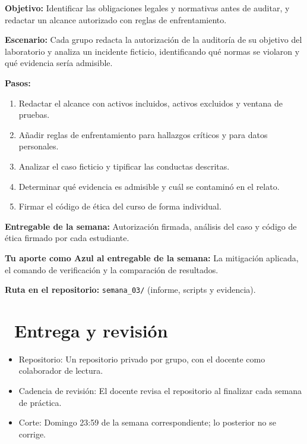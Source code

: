 \documentclass[11pt,a4paper]{article}
\newcommand{\iconotexto}[2]{\textcolor{cyanNeon}{\faIcon{#1}}~#2}
\begin{document}
\begin{tcolorbox}[cajaContenido,title={Semana 3 --- Carta de autorización y análisis de caso}]
\textbf{Objetivo:} Identificar las obligaciones legales y normativas antes de auditar, y redactar un alcance autorizado con reglas de enfrentamiento.

\textbf{Escenario:} Cada grupo redacta la autorización de la auditoría de su objetivo del laboratorio y analiza un incidente ficticio, identificando qué normas se violaron y qué evidencia sería admisible.


\textbf{Pasos:}
\begin{enumerate}[leftmargin=1.4em,itemsep=2pt,topsep=3pt]
  \item Redactar el alcance con activos incluidos, activos excluidos y ventana de pruebas.
  \item Añadir reglas de enfrentamiento para hallazgos críticos y para datos personales.
  \item Analizar el caso ficticio y tipificar las conductas descritas.
  \item Determinar qué evidencia es admisible y cuál se contaminó en el relato.
  \item Firmar el código de ética del curso de forma individual.
\end{enumerate}
\textbf{Entregable de la semana:} Autorización firmada, análisis del caso y código de ética firmado por cada estudiante.

\textbf{Tu aporte como Azul al entregable de la semana:} La mitigación aplicada, el comando de verificación y la comparación de resultados.

\textbf{Ruta en el repositorio:} \texttt{semana\_03/} (informe, scripts y evidencia).
\end{tcolorbox}

\section{\iconotexto{code-branch}{Entrega y revisión}}

\begin{itemize}[leftmargin=1.4em,itemsep=2pt,topsep=3pt]
  \item Repositorio: Un repositorio privado por grupo, con el docente como colaborador de lectura.
  \item Cadencia de revisión: El docente revisa el repositorio al finalizar cada semana de práctica.
  \item Corte: Domingo 23:59 de la semana correspondiente; lo posterior no se corrige.
\end{itemize}
\end{document}
